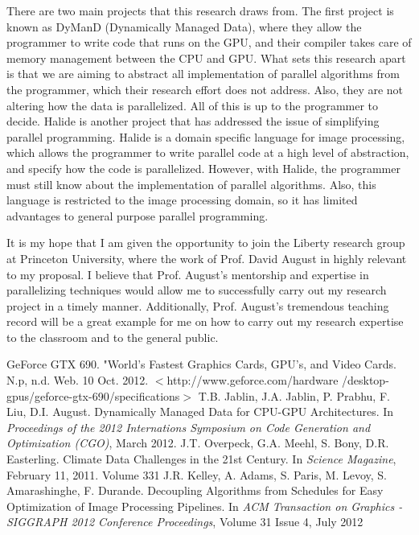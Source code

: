 \documentclass[a4paper,12pt]{article}
\begin{document}
There are two main projects that this research draws from. The first project is known as DyManD (Dynamically Managed Data)\cite{dymand}, where they allow the programmer to write code that runs on the GPU, and their compiler takes care of memory management between the CPU and GPU.  What sets this research apart is that we are aiming to abstract all implementation of parallel algorithms from the programmer, which their research effort does not address. Also, they are not altering how the data is parallelized.  All of this is up to the programmer to decide. Halide\cite{halide} is another project that has addressed the issue of simplifying parallel programming.  Halide is a domain specific language for image processing, which allows the programmer to write parallel code at a high level of abstraction, and specify how the code is parallelized.  However, with Halide, the programmer must still know about the implementation of parallel algorithms.  Also, this language is restricted to the image processing domain, so it has limited advantages to general purpose parallel programming.

It is my hope that I am given the opportunity to join the Liberty research group at Princeton University, where the work of Prof. David August in highly relevant to my proposal. I believe that Prof. August's mentorship and expertise in parallelizing techniques would allow me to successfully carry out my research project in a timely manner. Additionally, Prof. August's tremendous teaching record will be a great example for me on how to carry out my research expertise to the classroom and to the general public. 



\vspace{-2ex}
\begin{thebibliography}{9}
\footnotesize
\vspace{-2ex}
 GeForce GTX 690. "World's Fastest Graphics Cards, GPU's, and Video Cards. N.p, n.d. Web. 10 Oct. 2012.
 $<$http://www.geforce.com/hardware /desktop-gpus/geforce-gtx-690/specifications$>$
\vspace{-2ex}
 T.B. Jablin, J.A. Jablin, P. Prabhu, F. Liu, D.I. August. Dynamically Managed Data for CPU-GPU Architectures. In \textit{Proceedings of the 2012 Internations Symposium on Code Generation and Optimization (CGO)}, March 2012.
\vspace{-2ex}
 J.T. Overpeck, G.A. Meehl, S. Bony, D.R. Easterling.  Climate Data Challenges in the 21st Century.  In \textit{Science Magazine}, February 11, 2011.  Volume 331
\vspace{-2ex}
 J.R. Kelley, A. Adams, S. Paris, M. Levoy, S. Amarashinghe, F. Durande.  Decoupling Algorithms from Schedules for Easy Optimization of Image Processing Pipelines.  In \textit{ACM Transaction on Graphics - SIGGRAPH 2012 Conference Proceedings}, Volume 31 Issue 4, July 2012
\end{thebibliography}
\end{document}
